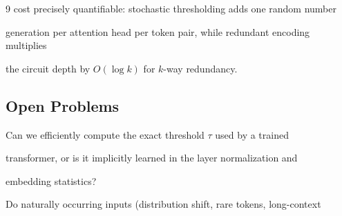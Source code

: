 \documentclass[11pt]{article}
\theoremstyle{definition}
\begin{document}
\begin{thebibliography}{9}
cost precisely quantifiable: stochastic thresholding adds one random number






generation per attention head per token pair, while redundant encoding multiplies






the circuit depth by $O(\log k)$ for $k$-way redundancy.













\subsection{Open Problems}













\begin{openproblem}






Can we efficiently compute the exact threshold $\tau$ used by a trained






transformer, or is it implicitly learned in the layer normalization and






embedding statistics?






\end{openproblem}













\begin{openproblem}






Do naturally occurring inputs (distribution shift, rare tokens, long-context







\end{openproblem}
\end{thebibliography}
\end{document}
